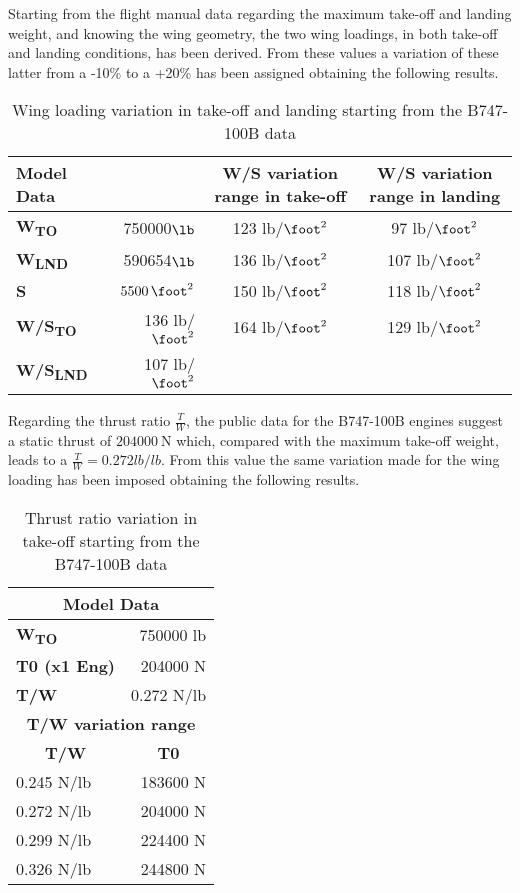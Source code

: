 \bigskip
\noindent
Starting from the flight manual data regarding the maximum take-off and landing weight, and knowing the wing geometry, the two wing loadings, in both take-off and landing conditions, has been derived. From these values a variation of these latter from a -10\% to a +20\% has been assigned obtaining the following results.  
%
\begin{table}[H]
  \centering
    \begin{tabular}{lr|c|c}
    \toprule
    \textbf{Model Data} &  \textbf{} & \textbf{W/S variation range in take-off} & \textbf{W/S variation range in landing} \\
    \midrule
    \textbf{W\textsubscript{TO}} & 750000$\si{\lb}$ & 123 lb/$\si{\square\foot}$ & 97 lb/$\si{\square\foot}$ \\
    \textbf{W\textsubscript{LND}} & 590654$\si{\lb}$ & 136 lb/$\si{\square\foot}$ & 107 lb/$\si{\square\foot}$ \\
    \textbf{S} & $\SI{5500}{\square\foot}$ & 150 lb/$\si{\square\foot}$ & 118 lb/$\si{\square\foot}$ \\
    \textbf{W/S\textsubscript{TO}} & 136 lb/$\si{\square\foot}$ & 164 lb/$\si{\square\foot}$ & 129 lb/$\si{\square\foot}$ \\
    \textbf{W/S\textsubscript{LND}} & 107 lb/$\si{\square\foot}$ & \textbf{ } & \textbf{ } \\
    \bottomrule
    \end{tabular}
    \caption{Wing loading variation in take-off and landing starting from the B747-100B data}
    \label{tab:WS}
\end{table}
%
\noindent
Regarding the thrust ratio $\frac{T}{W}$, the public data for the B747-100B engines suggest a static thrust of $\SI{204000}{\newton}$ which, compared with the maximum take-off weight, leads to a $\frac{T}{W}=0.272\si{lb}/\si{lb}$. From this value the same variation made for the wing loading has been imposed obtaining the following results.
%
\begin{table}[H]
  \centering
    \begin{tabular}{lr}
    \toprule
    \multicolumn{2}{c}{\textbf{Model Data}} \\
    \midrule
    \textbf{W\textsubscript{TO}} & 750000 lb \\
    \textbf{T0 (x1 Eng)} & 204000 N \\
    \textbf{T/W} & 0.272 N/lb \\
    \midrule
    \multicolumn{2}{c}{\textbf{T/W variation range}} \\
    \midrule
    \multicolumn{1}{c}{\textbf{T/W}} & \multicolumn{1}{c}{\textbf{T0}} \\
    0.245 N/lb & 183600 N \\
    0.272 N/lb & 204000 N \\
    0.299 N/lb & 224400 N \\
    0.326 N/lb & 244800 N \\
    \bottomrule
    \end{tabular}%
  \caption{Thrust ratio variation in take-off starting from the B747-100B data}
  \label{tab:TW}
\end{table}%
